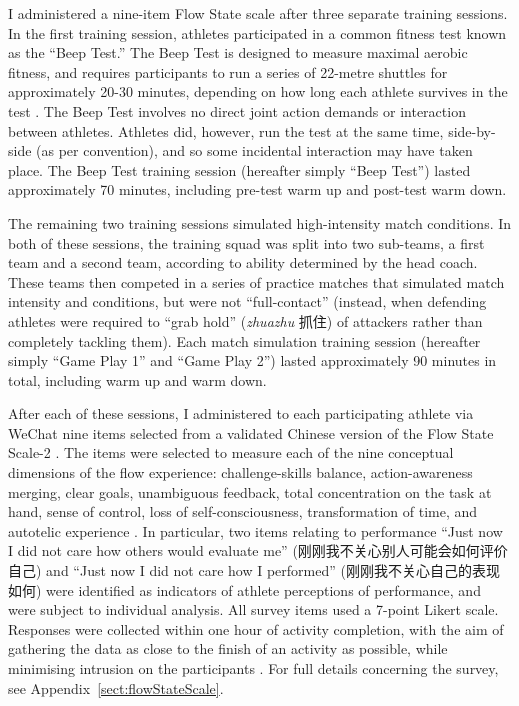 \begin{CJK}{UTF8}{gbsn}
I administered a nine-item Flow State scale \citep{Jackson2002} after three separate training sessions.  In the first training session, athletes participated in a common fitness test known as the ``Beep Test.''  The Beep Test is designed to measure maximal aerobic fitness, and requires participants to run a series of 22-metre shuttles for approximately 20-30 minutes, depending on how long each athlete survives in the test \citep[see][]{Stickland2003}.  The Beep Test involves no direct joint action demands or interaction between athletes.  Athletes did, however, run the test at the same time, side-by-side (as per convention), and so some incidental interaction may have taken place.  The Beep Test training session (hereafter simply ``Beep Test'') lasted approximately 70 minutes, including pre-test warm up and post-test warm down.

The remaining two training sessions simulated high-intensity match conditions. In both of these sessions, the training squad was split into two sub-teams, a first team and a second team, according to ability determined by the head coach.  These teams then competed in a series of practice matches that simulated match intensity and conditions, but were not ``full-contact'' (instead, when defending athletes were required to ``grab hold'' (\textit{zhuazhu} 抓住) of attackers rather than completely tackling them).  Each match simulation training session (hereafter simply ``Game Play 1'' and ``Game Play 2'') lasted approximately 90 minutes in total, including warm up and warm down.

After each of these sessions, I administered to each participating athlete via WeChat nine items selected from a validated Chinese version \citep{Liu2012} of the Flow State Scale-2 \citep{Jackson2002}.  The items were selected to measure each of the nine conceptual dimensions of the flow experience: challenge-skills balance, action-awareness merging, clear goals, unambiguous feedback, total concentration on the task at hand, sense of control, loss of self-consciousness, transformation of time, and autotelic experience \citep{Csikszentmihalyi1990}.  In particular, two items relating to performance ``Just now I did not care how others would evaluate me'' (刚刚我不关心别人可能会如何评价自己) and ``Just now I did not care how I performed'' (刚刚我不关心自己的表现如何) were identified as indicators of athlete perceptions of performance, and were subject to individual analysis. All survey items used a 7-point Likert scale.  Responses were collected within one hour of activity completion, with the aim of gathering the data as close to the finish of an activity as possible, while minimising intrusion on the participants \citep{Jackson2004}. For full details concerning the survey, see Appendix~\ref{sect:flowStateScale}.


\end{CJK}
